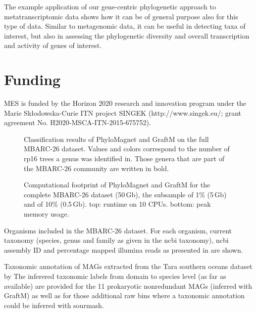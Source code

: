 \documentclass{bioinfo}
\begin{document}
The example application of our gene-centric phylogenetic approach to metatranscriptomic data shows how it can be of general purpose also for this type of data. Similar to metagenomic data, it can be useful in detecting taxa of interest, but also in assessing the phylogenetic diversity and overall transcription and activity of genes of interest.




\section*{Funding}
MES is funded by the Horizon 2020 research and innovation program under the Marie Sk\l{}odowska-Curie ITN project SINGEK (http://www.singek.eu/; grant agreement No. H2020-MSCA-ITN-2015-675752).

%



\newpage
\renewcommand\thefigure{S\arabic{figure}}
\setcounter{figure}{0}    
\begin{figure}[!h]%
\centerline{}
\caption{Classification results of PhyloMagnet and GraftM on the full MBARC-26 dataset. Values and colors correspond to the number of rp16 trees a genus was identified in. Those genera that are part of the MBARC-26 community are written in bold.}\label{fig:S1}
\end{figure}

\begin{figure}[!h]%
\centerline{}
\caption{Computational footprint of PhyloMagnet and GraftM for the complete MBARC-26 dataset (50\,Gb), the subsample of 1\% (5\,Gb) and of 10\% (0.5\,Gb). top: runtime on 10 CPUs. bottom: peak memory usage.}\label{fig:S2}
\end{figure}

\renewcommand\thetable{S\arabic{table}}
\setcounter{table}{0}    

\begin{table}[!t]
\caption{Organisms included in the MBARC-26 dataset. For each organism, current taxonomy (species, genus and family as given in the ncbi taxonomy), ncbi assembly ID and percentage mapped illumina reads as presented in \citet{Singer2016} are shown.}\label{tab:S1} 
\end{table}

\begin{table}[!t]
\caption{Taxonomic annotation of MAGs extracted from the Tara southern oceans dataset by \citet{Delmont2018} The inferered taxonomic labels from domain to species level (as far as available) are provided for the 11 prokaryotic nonredundant MAGs (inferred with GraftM) as well as for those additional raw bins where a taxonomic annotation could be inferred with sourmash.}\label{tab:S2} 
\end{table}
\end{document}
